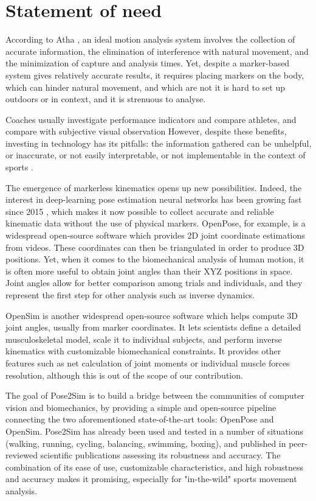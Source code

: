 \section{Statement of need}

According to Atha \cite{Atha1984}, an ideal motion analysis system involves the collection of accurate information, the elimination of interference with natural movement, and the minimization of capture and analysis times. Yet, despite a marker-based system gives relatively accurate results, it requires placing markers on the body, which can hinder natural movement, and which are not it is hard to set up outdoors or in context, and it is strenuous to analyse. 

Coaches usually investigate performance indicators and compare athletes, and compare with subjective visual observation 
However, despite these benefits, investing in technology has its pitfalls: the information gathered can be unhelpful, or inaccurate, or not easily interpretable, or not implementable in the context of sports \cite{Windt2020}. 

The emergence of markerless kinematics opens up new possibilities. Indeed, the interest in deep-learning pose estimation neural networks has been growing fast since 2015 \cite{Zheng2022}, which makes it now possible to collect accurate and reliable kinematic data without the use of physical markers. OpenPose, for example, is a widespread open-source software which provides 2D joint coordinate estimations from videos. These coordinates can then be triangulated in order to produce 3D positions. Yet, when it comes to the biomechanical analysis of human motion, it is often more useful to obtain joint angles than their XYZ positions in space. Joint angles allow for better comparison among trials and individuals, and they represent the first step for other analysis such as inverse dynamics.

OpenSim is another widespread open-source software which helps compute 3D joint angles, usually from marker coordinates. It lets scientists define a detailed musculoskeletal model, scale it to individual subjects, and perform inverse kinematics with customizable biomechanical constraints. It provides other features such as net calculation of joint moments or individual muscle forces resolution, although this is out of the scope of our contribution.

The goal of Pose2Sim is to build a bridge between the communities of computer vision and biomechanics, by providing a simple and open-source pipeline connecting the two aforementioned state-of-the-art tools: OpenPose and OpenSim. Pose2Sim has already been used and tested in a number of situations (walking, running, cycling, balancing, swimming, boxing), and published in peer-reviewed scientific publications \cite{Pagnon2021,Pagnon2022} assessing its robustness and accuracy. The combination of its ease of use, customizable characteristics, and high robustness and accuracy makes it promising, especially for "in-the-wild" sports movement analysis.

